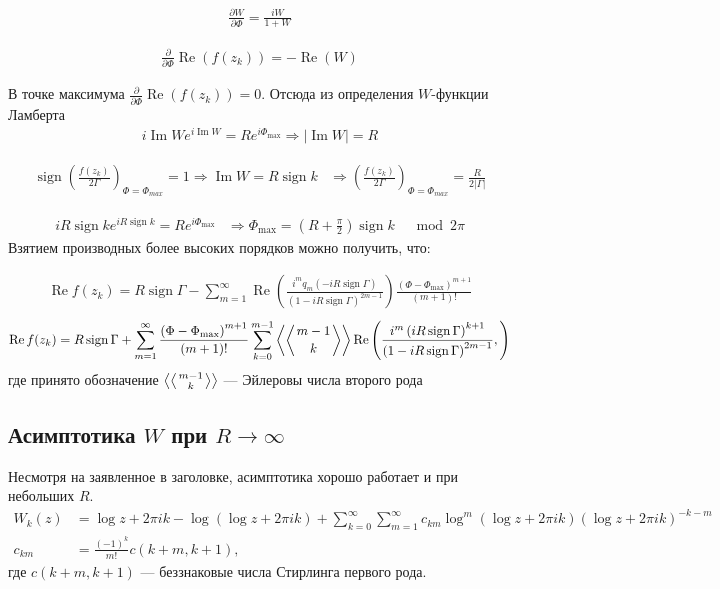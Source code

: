 \documentclass[a4paper, 12pt]{article}
\DeclareMathOperator*{\sign}{sign}
\DeclareMathOperator*{\Real}{Re}
\DeclareMathOperator*{\Imag}{Im}
\newenvironment{eqw}{\begin{equation} \begin{aligned}}   
    {\end{aligned}    \end{equation}}
\begin{document}
\begin{eqw}
    \frac{\partial W}{\partial \Phi} = \frac{iW}{1+W}
\end{eqw}

\begin{eqw}
    \frac{\partial}{\partial\Phi}\Real\left(f(z_k)\right) = -\Real(W)
\end{eqw}

В точке максимума $\frac{\partial}{\partial\Phi}\Real\left(f(z_k)\right) = 0$. Отсюда из определения $W$-функции Ламберта
\begin{eqw}
    i\Imag W e^{i\Imag W} = R e^{i\Phi_{\max}} \Rightarrow \left|\Imag W\right| = R
\end{eqw}

\begin{eqw}
    \sign\left(\frac{f(z_k)}{2\Gamma}\right)_{\Phi = \Phi_{max}} = 1 \Rightarrow \Imag W = R\sign k 
    &\Rightarrow \left(\frac{f(z_k)}{2\Gamma}\right)_{\Phi = \Phi_{max}} = \frac{R}{2|\Gamma|}
\end{eqw}

\begin{eqw}
    i R \sign k  e^{i R \sign k } = R e^{i\Phi_{\max}} &\Rightarrow \Phi_{\max} = \left(R+\frac{\pi}{2}\right)\sign k \;\;\; \mod 2\pi
\end{eqw}
Взятием производных более высоких порядков можно получить, что:

\begin{eqw}
    \Real f(z_k) = R\sign \Gamma - \sum\limits_{m=1}^{\infty} \Real\left(\frac{i^m q_{m}\left(-iR\sign \Gamma\right)}{\left(1-iR\sign \Gamma\right)^{2m-1}}\right)\frac{\left(\Phi - \Phi_{\max}\right)^{m+1}}{(m+1)!}
\end{eqw}
\begin{eqw}
    \Real f(z_k) = R\sign \Gamma + \sum\limits_{m=1}^{\infty} \frac{\left(\Phi - \Phi_{\max}\right)^{m+1}}{(m+1)!}
    \sum\limits_{k=0}^{m-1}\left\langle\left\langle{m-1}\atop {k}\right\rangle\right\rangle 
    \Real\left(\frac{i^{m}\left(i R\sign \Gamma\right)^{k+1} }{\left(1-iR\sign\Gamma\right)^{2m-1}},\right)
\end{eqw}
где принято обозначение $\left\langle\left\langle{m-1}\atop {k}\right\rangle\right\rangle$ --- Эйлеровы числа второго рода
\subsection*{Асимптотика $W$ при $R \to \infty$}
Несмотря на заявленное в заголовке, асимптотика хорошо работает и при небольших $R$.
\begin{eqw}
    W_k(z) &= \log z + 2\pi i k - \log\left(\log z + 2\pi i k\right) + \sum\limits_{k=0}^{\infty}\sum\limits_{m=1}^{\infty} c_{km}\log^m\left(\log z + 2\pi i k\right)\left(\log z + 2\pi i k \right)^{-k-m}\\
    c_{km} &= \frac{(-1)^k}{m!} c(k+m, k+1),
\end{eqw}
где $c(k+m, k+1)$ ---  беззнаковые числа Стирлинга первого рода.
\end{document}
